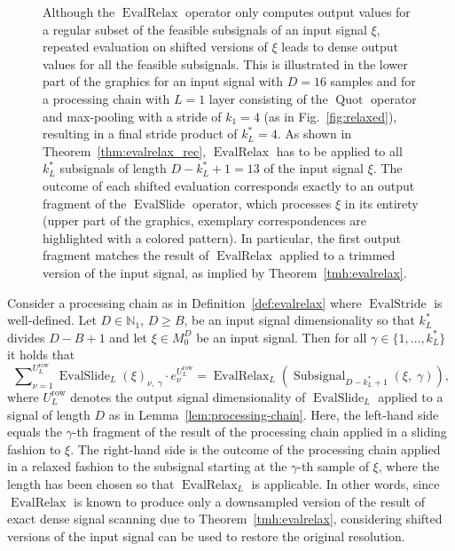 \documentclass[journal]{IEEEtran}
\newcommand{\N}{\mathbb{N}}
\newcommand{\ROI}{B}
\newcommand{\discint}[2]{\{#1,\dotsc,#2\}}
\newcommand{\inint}[2]{\in\discint{#1}{#2}}
\DeclareMathOperator{\Subsignal}{Subsignal}
\DeclareMathOperator{\EvalStride}{EvalStride}
\DeclareMathOperator{\EvalSlide}{EvalSlide}
\newcommand{\row}{\operatorname{row}}
\DeclareMathOperator{\EvalRelax}{EvalRelax}
\begin{document}
\begin{figure}[t]
  \centering
  \caption{Although the $\EvalRelax$ operator only computes output values for a regular subset of the feasible subsignals of an input signal $\xi$, repeated evaluation on shifted versions of $\xi$ leads to dense output values for all the feasible subsignals.
    This is illustrated in the lower part of the graphics for an input signal with $D = 16$ samples and for a processing chain with $L = 1$ layer consisting of the $\operatorname{Quot}$ operator and max-pooling with a stride of $k_1 = 4$ (as in Fig.~\ref{fig:relaxed}), resulting in a final stride product of $k_L^* = 4$.
    As shown in Theorem~\ref{thm:evalrelax_rec}, $\EvalRelax$ has to be applied to all $k_L^*$ subsignals of length $D - k_L^* + 1 = 13$ of the input signal $\xi$.
    The outcome of each shifted evaluation corresponds exactly to an output fragment of the $\EvalSlide$ operator, which processes $\xi$ in its entirety (upper part of the graphics, exemplary correspondences are highlighted with a colored pattern).
    In particular, the first output fragment matches the result of $\EvalRelax$ applied to a trimmed version of the input signal, as implied by Theorem~\ref{tmh:evalrelax}.}
  \label{fig:relaxed-stitch}
\end{figure}\begin{theorem}
\label{thm:evalrelax_rec}
Consider a processing chain as in Definition~\ref{def:evalrelax} where $\EvalStride$ is well-defined.
Let $D\in\N_1$, $D\geq\ROI$, be an input signal dimensionality so that $k_L^*$ divides $D - \ROI + 1$ and let $\xi\in M_0^D$ be an input signal.
Then for all $\gamma\inint{1}{k_L^*}$ it holds that
\begin{displaymath}
  \sum\nolimits_{\nu = 1}^{U_L^{\row}} \EvalSlide_L(\xi)_{\nu,\;\gamma}\cdot e_\nu^{U_L^{\row}}
  = \EvalRelax_L(\Subsignal_{D - k_L^* + 1}(\xi,\;\gamma))\text{,}
\end{displaymath}
where $U_L^{\row}$ denotes the output signal dimensionality of $\EvalSlide_L$ applied to a signal of length $D$ as in Lemma~\ref{lem:processing-chain}.
Here, the left-hand side equals the $\gamma$-th fragment of the result of the processing chain applied in a sliding fashion to $\xi$.
The right-hand side is the outcome of the processing chain applied in a relaxed fashion to the subsignal starting at the $\gamma$-th sample of $\xi$, where the length has been chosen so that $\EvalRelax_L$ is applicable.
In other words, since $\EvalRelax$ is known to produce only a downsampled version of the result of exact dense signal scanning due to Theorem~\ref{tmh:evalrelax}, considering shifted versions of the input signal can be used to restore the original resolution.

\end{theorem}
\end{document}
